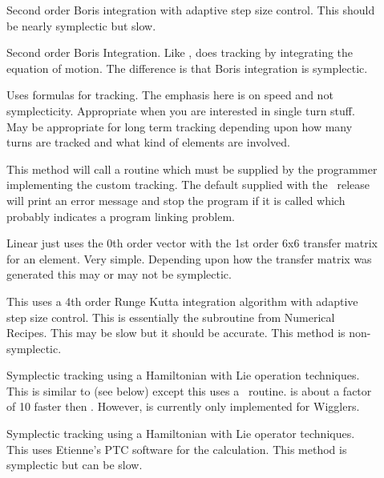 \begin{description}
\item[]
Second order Boris integration\cite{b:boris} with adaptive step size control.
This should be nearly symplectic but slow.

\item[]
Second order Boris Integration. Like ,  does
tracking by integrating the equation of motion. The difference is that
Boris integration is symplectic.

\item[]
Uses formulas for tracking. The emphasis here is on speed and not
symplecticity. Appropriate when you are interested in single turn
stuff. May be appropriate for long term tracking depending upon how
many turns are tracked and what kind of elements are involved. 

\item[]
This method will call a routine  which must be
supplied by the programmer implementing the custom tracking. The
default  supplied with the \bmad\ release will print
an error message and stop the program if it is called which probably
indicates a program linking problem.

\item[]
Linear just uses the 0th order vector with the 1st order 6x6 transfer
matrix for an element. Very simple.  Depending upon how the transfer
matrix was generated this may or may not be symplectic.

\item[]
This uses a 4th order Runge Kutta integration algorithm with adaptive
step size control.  This is essentially the  subroutine
from Numerical Recipes\cite{b:nr}. This may be slow but it should be
accurate. This method is non-symplectic.

\item[]
Symplectic tracking using a Hamiltonian with Lie operation techniques.
This is similar to  (see below) except this uses a
\bmad\ routine.  is about a factor of 10 faster 
then . However,  is
currently only implemented for Wigglers.

\item[]
Symplectic tracking using a Hamiltonian with Lie operator techniques.
This uses Etienne's PTC software for the calculation. This method is
symplectic but can be slow.


\end{description}
